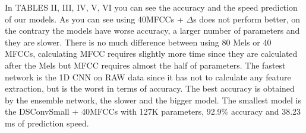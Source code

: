 \documentclass[conference]{IEEEtran}
\begin{document}
In TABLES II, III, IV, V, VI you can see the accuracy and the speed prediction of our models.
As you can see using 40MFCCs + $\Delta$s does not perform better, on the contrary the models have worse accuracy, a larger number of parameters and they are slower.
There is no much difference between using 80 Mels or 40 MFCCs, calculating MFCC requires slightly more time since they are calculated after the Mels but MFCC requires almost the half of parameters.
The fastest network is the 1D CNN on RAW data since it has not to calculate any feature extraction, but is the worst in terms of accuracy.
The best accuracy is obtained by the ensemble network, the slower and the bigger model.
The smallest model is the DSConvSmall + 40MFCCs with 127K parameters, 92.9\% accuracy and 38.23 ms of prediction speed.
\begin{center}
\begin{table}[]
\caption{1DCNN}
\end{table}
\end{center}
\end{document}
